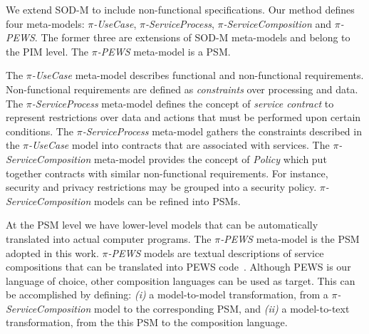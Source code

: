 We extend SOD-M to include non-functional specifications.
Our method defines four meta-models: \textit{$\pi$-UseCase}, \textit{$\pi$-ServiceProcess}, \textit{$\pi$-ServiceCom\-po\-si\-tion} and \textit{$\pi$-PEWS}.
The former three are extensions of SOD-M meta-models and belong to the PIM level.
The \textit{$\pi$-PEWS} meta-model is a PSM.

The \textit{$\pi$-UseCase} meta-model describes functional and non-functional requirements.
Non-functional requirements are defined as \textit{constraints} over processing and data.
The \textit{$\pi$-ServiceProcess} meta-model defines the concept of \textit{service contract} to represent restrictions over data and actions that must be performed upon certain conditions.
The \textit{$\pi$-ServiceProcess} meta-model gathers the constraints
described in the \textit{$\pi$-UseCase} model into contracts that are associated
with services.
The \textit{$\pi$-ServiceComposition} meta-model provides the concept of \textit{Policy}
which put together contracts with similar non-functional requirements.
For instance, security and privacy restrictions may be grouped into a security policy.
\textit{$\pi$-ServiceComposition} models can be refined into PSMs.

At the PSM level we have lower-level models that can be automatically translated into actual computer programs.
The \textit{$\pi$-PEWS} meta-model is the PSM adopted in this work.
\textit{$\pi$-PEWS} models are textual descriptions of service compositions that can be translated into PEWS code~\cite{BaCAM05,Placido2010LTPD}.
Although PEWS is our language of choice, other composition languages can be used as target.
This can be accomplished by defining: \textit{(i)} a model-to-model transformation, from a \textit{$\pi$-ServiceComposition} model to the corresponding PSM, and \textit{(ii)} a model-to-text transformation, from the this PSM to the composition language.
